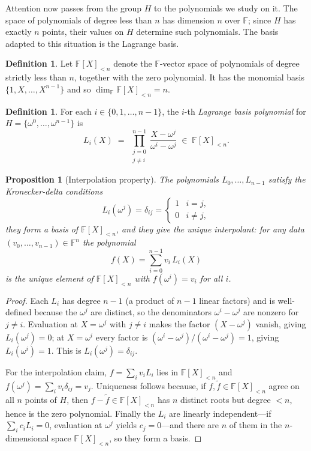 \documentclass[11pt,a4paper]{article}
\newtheorem{proposition}[theorem]{Proposition}
\theoremstyle{definition}
\newtheorem{definition}[theorem]{Definition}
\theoremstyle{remark}
\newcommand{\F}{\ensuremath{\mathbb{F}}}
\begin{document}
Attention now passes from the group \(H\) to the polynomials we study on it. The space of polynomials of degree less than \(n\) has dimension \(n\) over \(\F\); since \(H\) has exactly \(n\) points, their values on \(H\) determine such polynomials. The basis adapted to this situation is the Lagrange basis.

\begin{definition}\label{rootsofunity:def-poly}
Let \(\F[X]_{<n}\) denote the \(\F\)-vector space of polynomials of degree strictly less than \(n\), together with the zero polynomial. It has the monomial basis \(\{1, X, \dots, X^{n-1}\}\) and so \(\dim_\F \F[X]_{<n} = n\).
\end{definition}

\begin{definition}\label{rootsofunity:def-lagrange}
For each \(i \in \{0,1,\dots,n-1\}\), the \(i\)-th \emph{Lagrange basis polynomial} for \(H = \{\omega^0,\dots,\omega^{n-1}\}\) is
\[
  L_i(X) \;=\; \prod_{\substack{j=0 \\ j \ne i}}^{n-1} \frac{X - \omega^j}{\omega^i - \omega^j} \;\in\; \F[X]_{<n}.
\]
\end{definition}

\begin{proposition}[Interpolation property]\label{rootsofunity:prp-lagrangeprop}
The polynomials \(L_0, \dots, L_{n-1}\) satisfy the Kronecker-delta conditions
\[
  L_i(\omega^j) = \delta_{ij} = \begin{cases} 1 & i = j,\\ 0 & i \ne j,\end{cases}
\]
they form a basis of \(\F[X]_{<n}\), and they give the unique interpolant: for any data \((v_0,\dots,v_{n-1}) \in \F^n\) the polynomial
\[
  f(X) = \sum_{i=0}^{n-1} v_i\, L_i(X)
\]
is the unique element of \(\F[X]_{<n}\) with \(f(\omega^i) = v_i\) for all \(i\).
\end{proposition}

\begin{proof}
Each \(L_i\) has degree \(n-1\) (a product of \(n-1\) linear factors) and is well-defined because the \(\omega^j\) are distinct, so the denominators \(\omega^i - \omega^j\) are nonzero for \(j \ne i\). Evaluation at \(X = \omega^j\) with \(j \ne i\) makes the factor \((X-\omega^j)\) vanish, giving \(L_i(\omega^j)=0\); at \(X = \omega^i\) every factor is \((\omega^i - \omega^j)/(\omega^i-\omega^j)=1\), giving \(L_i(\omega^i)=1\). This is \(L_i(\omega^j)=\delta_{ij}\).

For the interpolation claim, \(f = \sum_i v_i L_i\) lies in \(\F[X]_{<n}\) and \(f(\omega^j) = \sum_i v_i \delta_{ij} = v_j\). Uniqueness follows because, if \(f, \tilde f \in \F[X]_{<n}\) agree on all \(n\) points of \(H\), then \(f - \tilde f \in \F[X]_{<n}\) has \(n\) distinct roots but degree \(< n\), hence is the zero polynomial. Finally the \(L_i\) are linearly independent---if \(\sum_i c_i L_i = 0\), evaluation at \(\omega^j\) yields \(c_j = 0\)---and there are \(n\) of them in the \(n\)-dimensional space \(\F[X]_{<n}\), so they form a basis.
\end{proof}
\end{document}
